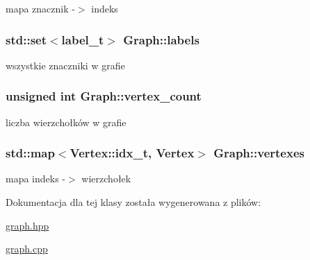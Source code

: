 mapa znacznik -\/$>$ indeks 

\hypertarget{classGraph_a752008a468385625c22da499d248ada3}{
\subsubsection[{labels}]{\setlength{\rightskip}{0pt plus 5cm}std\-::set$<${\bf label\-\_\-t}$>$ Graph\-::labels\hspace{0.3cm}{\ttfamily [private]}}}\label{classGraph_a752008a468385625c22da499d248ada3}


wszystkie znaczniki w grafie 

\hypertarget{classGraph_aa0961f75ec603fa6b4f1e631b70233f1}{
\subsubsection[{vertex\-\_\-count}]{\setlength{\rightskip}{0pt plus 5cm}unsigned int Graph\-::vertex\-\_\-count\hspace{0.3cm}{\ttfamily [private]}}}\label{classGraph_aa0961f75ec603fa6b4f1e631b70233f1}


liczba wierzchołków w grafie 

\hypertarget{classGraph_a69d5f1746e168b9555daa83b84c0341b}{
\subsubsection[{vertexes}]{\setlength{\rightskip}{0pt plus 5cm}std\-::map$<${\bf Vertex\-::idx\-\_\-t}, {\bf Vertex}$>$ Graph\-::vertexes\hspace{0.3cm}{\ttfamily [private]}}}\label{classGraph_a69d5f1746e168b9555daa83b84c0341b}


mapa indeks -\/$>$ wierzchołek 



Dokumentacja dla tej klasy została wygenerowana z plików\-:\begin{DoxyCompactItemize}
\item 
\hyperlink{graph_8hpp}{graph.\-hpp}\item 
\hyperlink{graph_8cpp}{graph.\-cpp}\end{DoxyCompactItemize}
